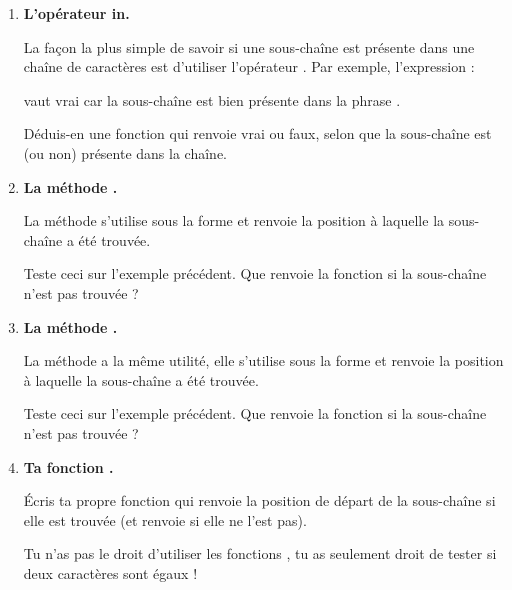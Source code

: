 \documentclass[11pt,class=report,crop=false]{standalone}
\begin{document}
\begin{activite}[Chercher]


\begin{enumerate}
  \item \textbf{L'opérateur \og{}in\fg{}.}
  
  
  La façon la plus simple de savoir si une sous-chaîne est présente dans une chaîne de caractères est d'utiliser l'opérateur \og{}\fg{}. Par exemple, l'expression :
  
  \centerline{}
  
  vaut \og{}vrai\fg{} car la sous-chaîne  est bien présente dans la phrase
  . 
  
  Déduis-en une fonction  qui renvoie \og{}vrai\fg{} ou \og{}faux\fg{}, selon que la sous-chaîne est (ou non) présente dans la chaîne.
  
  \item \textbf{La méthode .}
  
  
  La méthode  s'utilise sous la forme  et renvoie la position à laquelle la sous-chaîne a été trouvée. 
  
  Teste ceci sur l'exemple précédent. Que renvoie la fonction si la sous-chaîne n'est pas trouvée ?
 
   \item \textbf{La méthode .}
  
  
  La méthode  a la même utilité, elle s'utilise sous la forme  et renvoie la position à laquelle la sous-chaîne a été trouvée. 

  Teste ceci sur l'exemple précédent. Que renvoie la fonction si la sous-chaîne n'est pas trouvée ?
 
  
  \item \textbf{Ta fonction .}
  
  Écris ta propre fonction  qui renvoie la position de départ de la sous-chaîne si elle est trouvée (et renvoie  si elle ne l'est pas).
  
  Tu n'as pas le droit d'utiliser les fonctions \Python{}, tu as seulement droit de tester si deux caractères sont égaux !  
  
\end{enumerate}   
     
\end{activite}
\end{document}
